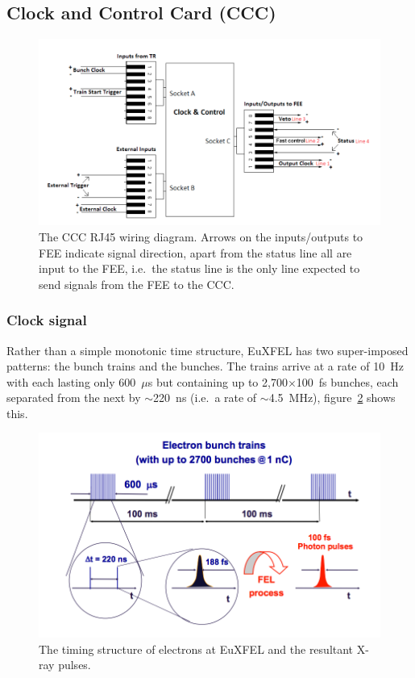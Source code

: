 \subsection{Clock and Control Card (CCC)} %
\label{sub:clock_and_control_card}
\begin{figure}[htbp]
  \centering
    \includegraphics[width=.9\textwidth]{images/Other/CCC_RJ45_diagram.png}
  \caption{The CCC RJ45 wiring diagram. Arrows on the inputs/outputs to FEE indicate signal direction, apart from the status line all are input to the FEE, i.e.\ the status line is the only line expected to send signals from the FEE to the CCC.}
  \label{fig:CCC_RJ45_diagram}
\end{figure}

\subsubsection{Clock signal} %
\label{sub:clock_signal}
Rather than a simple monotonic time structure, EuXFEL has two super-imposed patterns: the bunch trains and the bunches. The trains arrive at a rate of 10~Hz with each lasting only 600~\(\mu\)s but containing up to 2,700\( \times\)100~fs bunches, each separated from the next by \(\sim\)220~ns (i.e.\ a rate of \(\sim\)4.5~MHz), figure~\ref{fig:XFEL-time_structure} shows this.
\begin{figure}[htbp]
  \centering
    \includegraphics[width=.9\textwidth]{images/Other/XFEL-time_structure.png}
  \caption{The timing structure of electrons at EuXFEL and the resultant X-ray pulses. }
  \label{fig:XFEL-time_structure}
\end{figure}

